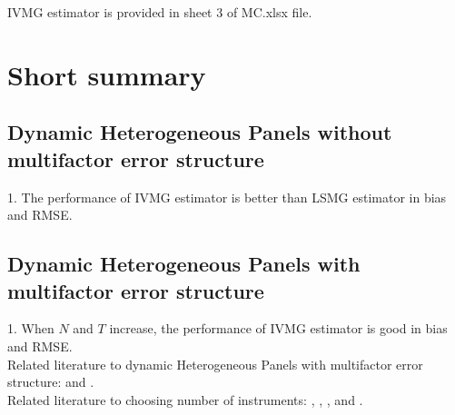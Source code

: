 \documentclass[12pt,a4paper,hyperref]{article}
\begin{document}
IVMG estimator is provided in sheet 3 of MC.xlsx file. \\

\section{Short summary}
\subsection{Dynamic Heterogeneous Panels without multifactor error structure}
1. The performance of IVMG estimator is better than LSMG estimator in bias and RMSE.


\subsection{Dynamic Heterogeneous Panels with multifactor error structure}
1. When $N$ and $T$ increase, the performance of IVMG estimator is good in bias and RMSE. \\
Related literature to dynamic Heterogeneous Panels with multifactor error structure: \citet{Chudik:2015} and \citet{Norkute:2019}.\\
Related literature to choosing number of instruments: \citet{Stephen:2001}, \citet{Swanson:2005}, \citet{Marine:2012}, \citet{Bai:2010} and \citet{Kang:2019}.


\newpage

\renewcommand\refname{References}


\end{document}
